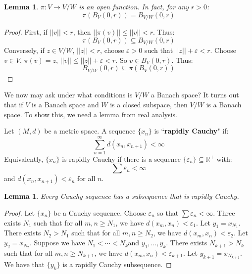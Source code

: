 \documentclass[a4paper,12pt]{report}
\newcommand{\varep}{ \varepsilon }
\newcommand{\sse} {\subseteq}
\newtheorem{lemma}[theorem]{Lemma}
\newenvironment{definition}[1][Definition.]{\begin{trivlist}
\item[\hskip \labelsep {\bfseries #1}]}{\end{trivlist}}
\begin{document}
	\begin{lemma}
	$\pi : V \rightarrow V / W$ is an open function. In fact, for any $r > 0$:
	\[ \pi(B_V(0, r)) = B_{V/W}(0, r) \]
	\end{lemma}
	\begin{proof}
	First, if $||v|| < r$, then $||\pi(v)|| \leq ||v|| < r$. Thus:
	\[ \pi(B_V(0, r)) \sse B_{V/W}(0, r) \]
	Conversely, if $z \in V / W$, $||z|| < r$, choose $\varep > 0$ such that $||z|| + \varep < r$. Choose $v \in V$, $\pi(v) = z$, $||v|| \leq ||z|| + \varep < r$. So $v \in B_V(0, r)$. Thus:
	\[ B_{V/W}(0, r) \sse \pi(B_V(0, r)) \]
	\end{proof}
	
	\noindent We now may ask under what conditions is $V / W$ a Banach space? It turns out that if $V$ is a Banach space and $W$ is a closed subspace, then $V/W$ is a Banach space. To show this, we need a lemma from real analysis.
	
	\begin{definition}
	Let $(M, d)$ be a metric space. A sequence $\{x_n\}$ is ``\textbf{rapidly Cauchy}" if:
	\[ \sum_{n=1}^\infty d(x_n, x_{n+1}) < \infty \]
	Equivalently, $\{x_n\}$ is rapidly Cauchy if there is a sequence $\{\varep_n\} \sse \mathbb{R}^+$ with:
	\[ \sum \varep_n < \infty \]
	and $d(x_n, x_{n+1}) < \varep_n$ for all $n$.
	\end{definition}
	
	\begin{lemma}
	Every Cauchy sequence has a subsequence that is rapidly Cauchy.
	\end{lemma}
	\begin{proof}
	Let $\{x_n\}$ be a Cauchy sequence. Choose $\varep_n$ so that $\sum \varep_n < \infty$. Three exists $N_1$ such that for all $m, n \geq N_1$, we have $d(x_m, x_n) < \varep_1$. Let $y_1 = x_{N_1}$. There exists $N_2 > N_1$ such that for all $m, n \geq N_2$, we have $d(x_m, x_n) < \varep_2$. Let $y_2 = x_{N_2}$. Suppose we have $N_1 < \cdots <  N_k$and $y_1, \ldots, y_k$. There exists $N_{k+1} > N_k$ such that for all $m, n \geq N_{k+1}$, we have $d(x_m, x_n) < \varep_{k+1}$. Let $y_{k+1} = x_{N_{k+1}}$. We have that $\{y_k\}$ is a rapidly Cauchy subsequence.
	\end{proof}
	
\end{document}
